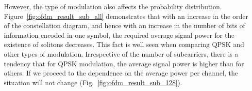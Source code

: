 However, the type of modulation also affects the probability distribution. Figure~\ref{fig:ofdm_result_sub_all} demonstrates that with an increase in the order of the constellation diagram, and hence with an increase in the number of bits of information encoded in one symbol, the required average signal power for the existence of solitons decreases. This fact is well seen when comparing QPSK and other types of modulation. Irrespective of the number of subcarriers, there is a tendency that for QPSK modulation, the average signal power is higher than for others. If we proceed to the dependence on the average power per channel, the situation will not change (Fig.~\ref{fig:ofdm_result_sub_128}).

\begin{figure}[htpb]
    \begin{minipage}[h]{0.47\linewidth}
    \end{minipage}
    \hfill
    \begin{minipage}[h]{0.47\linewidth}
        \center{
}
\end{minipage}
\end{figure}
